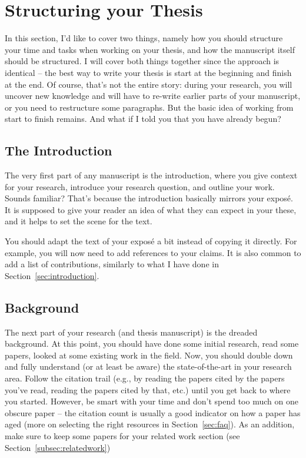 \documentclass[a4]{article}
\begin{document}
\section{Structuring your Thesis}
\label{sec:structure}

In this section, I'd like to cover two things, namely how you should structure your time and tasks when working on your thesis, and how the manuscript itself should be structured.
I will cover both things together since the approach is identical -- the best way to write your thesis is start at the beginning and finish at the end.
Of course, that's not the entire story: during your research, you will uncover new knowledge and will have to re-write earlier parts of your manuscript, or you need to restructure some paragraphs.
But the basic idea of working from start to finish remains.
And what if I told you that you have already begun?

\subsection{The Introduction}

The very first part of any manuscript is the introduction, where you give context for your research, introduce your research question, and outline your work.
Sounds familiar?
That's because the introduction basically mirrors your expos\'e.
It is supposed to give your reader an idea of what they can expect in your these, and it helps to set the scene for the text.

You should adapt the text of your expos\'e a bit instead of copying it directly.
For example, you will now need to add references to your claims.
It is also common to add a list of contributions, similarly to what I have done in Section~\ref{sec:introduction}.

\subsection{Background}

The next part of your research (and thesis manuscript) is the dreaded background.
At this point, you should have done some initial research, read some papers, looked at some existing work in the field.
Now, you should double down and fully understand (or at least be aware) the state-of-the-art in your research area.
Follow the citation trail (e.g., by reading the papers cited by the papers you've read, reading the papers cited by that, etc.) until you get back to where you started.
However, be smart with your time and don't spend too much on one obscure paper -- the citation count is usually a good indicator on how a paper has aged (more on selecting the right resources in Section~\ref{sec:faq}).
As an addition, make sure to keep some papers for your related work section (see Section~\ref{subsec:relatedwork})
\end{document}
